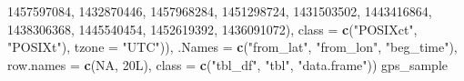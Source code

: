 \documentclass[12pt]{book}
\newenvironment{Shaded}{\begin{snugshade}}{\end{snugshade}}
\newcommand{\DataTypeTok}[1]{\textcolor[rgb]{0.13,0.29,0.53}{#1}}
\newcommand{\DecValTok}[1]{\textcolor[rgb]{0.00,0.00,0.81}{#1}}
\newcommand{\KeywordTok}[1]{\textcolor[rgb]{0.13,0.29,0.53}{\textbf{#1}}}
\newcommand{\NormalTok}[1]{#1}
\newcommand{\OtherTok}[1]{\textcolor[rgb]{0.56,0.35,0.01}{#1}}
\newcommand{\StringTok}[1]{\textcolor[rgb]{0.31,0.60,0.02}{#1}}
\numberwithin{equation}{chapter}
\begin{document}
\begin{Shaded}
\begin{Highlighting}[]
        \DecValTok{1457597084}\NormalTok{, }\DecValTok{1432870446}\NormalTok{, }\DecValTok{1457968284}\NormalTok{, }\DecValTok{1451298724}\NormalTok{, }\DecValTok{1431503502}\NormalTok{, }
        \DecValTok{1443416864}\NormalTok{, }\DecValTok{1438306368}\NormalTok{, }\DecValTok{1445540454}\NormalTok{, }\DecValTok{1452619392}\NormalTok{, }\DecValTok{1436091072}\NormalTok{), }
      \DataTypeTok{class =} \KeywordTok{c}\NormalTok{(}\StringTok{"POSIXct"}\NormalTok{, }\StringTok{"POSIXt"}\NormalTok{), }\DataTypeTok{tzone =} \StringTok{"UTC"}\NormalTok{)), }
    \DataTypeTok{.Names =} \KeywordTok{c}\NormalTok{(}\StringTok{"from_lat"}\NormalTok{, }\StringTok{"from_lon"}\NormalTok{, }\StringTok{"beg_time"}\NormalTok{), }
    \DataTypeTok{row.names =} \KeywordTok{c}\NormalTok{(}\OtherTok{NA}\NormalTok{, 20L), }
    \DataTypeTok{class =} \KeywordTok{c}\NormalTok{(}\StringTok{"tbl_df"}\NormalTok{, }\StringTok{"tbl"}\NormalTok{, }\StringTok{"data.frame"}\NormalTok{))}
\NormalTok{gps_sample}
\end{Highlighting}
\end{Shaded}
\end{document}
